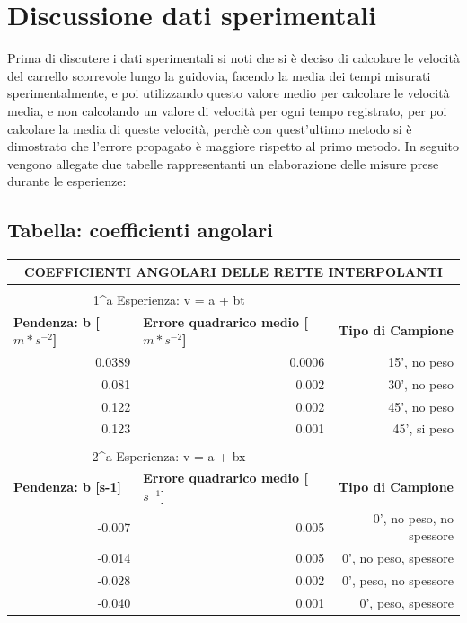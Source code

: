\documentclass[12pt]{article} %
\begin{document}
\section{Discussione dati sperimentali}
	Prima di discutere i dati sperimentali si noti che si è deciso di calcolare le velocità del carrello scorrevole lungo la guidovia, facendo la media dei tempi misurati sperimentalmente, e poi utilizzando questo valore medio per calcolare le velocità media, e non calcolando un valore di velocità per ogni tempo registrato, per poi calcolare la media di queste velocità, perchè con quest'ultimo metodo si è dimostrato che l'errore propagato è maggiore rispetto al primo metodo. 
	In seguito vengono allegate due tabelle rappresentanti un elaborazione delle misure prese durante le esperienze:
	\subsection {Tabella: coefficienti angolari}
		\begin{table}[H]
		\begin{tabular}{|r|r|r|}
		\hline
		\multicolumn{ 3}{|c|}{\textbf{COEFFICIENTI ANGOLARI DELLE RETTE INTERPOLANTI}} \\ \hline
		\multicolumn{ 3}{|c|}{} \\ \hline
		\multicolumn{ 2}{|c|}{1^a Esperienza: v = a + bt} & \multicolumn{1}{l|}{} \\ \hline
		\multicolumn{1}{|l|}{\textbf{Pendenza: b [$m*s^{-2}$]}} & \multicolumn{1}{l|}{\textbf{Errore quadrarico medio [$m*s^{-2}$]}} & \textbf{Tipo di Campione} \\ \hline
		0.0389 & 0.0006 & 15', no peso \\ \hline
		0.081 & 0.002 & 30', no peso \\ \hline
		0.122 & 0.002 & 45', no peso \\ \hline
		0.123 & 0.001 & 45', si peso \\ \hline
		\multicolumn{ 3}{|c|}{} \\ \hline
		\multicolumn{ 2}{|c|}{2^a Esperienza: v = a + bx} & \multicolumn{1}{l|}{} \\ \hline
		\multicolumn{1}{|l|}{\textbf{Pendenza: b [s-1]}} & \multicolumn{1}{l|}{\textbf{Errore quadrarico medio [$s^{-1}$]}} & \textbf{Tipo di Campione} \\ \hline
		-0.007 & 0.005 & 0', no peso, no spessore \\ \hline
		-0.014 & 0.005 & 0', no peso, spessore \\ \hline
		-0.028 & 0.002 & 0', peso, no spessore \\ \hline
		-0.040 & 0.001 & 0', peso, spessore \\ \hline
		\end{tabular}
		\label{tab:coeff}
		\end{table}
\end{document}
